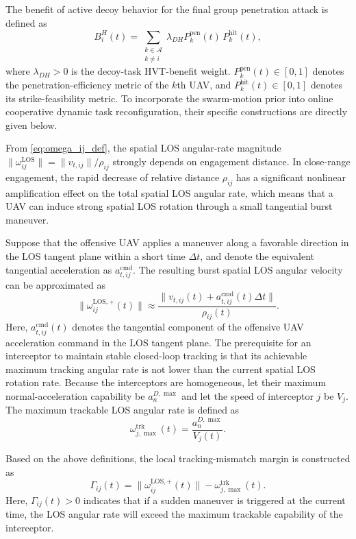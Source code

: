 \documentclass{cja}
\begin{document}
The benefit of active decoy behavior for the final group penetration attack is defined as
\begin{equation}
B_i^{H}(t)
=
\sum_{\substack{k\in\mathcal{A}\\k\neq i}}
\lambda_{DH} P_k^{\mathrm{pen}}(t)\,P_k^{\mathrm{hit}}(t),
\end{equation}
where $\lambda_{DH}>0$ is the decoy-task HVT-benefit weight. $P_k^{\mathrm{pen}}(t)\in[0,1]$ denotes the penetration-efficiency metric of the $k$th UAV, and $P_k^{\mathrm{hit}}(t)\in[0,1]$ denotes its strike-feasibility metric. To incorporate the swarm-motion prior into online cooperative dynamic task reconfiguration, their specific constructions are directly given below.

From \eqref{eq:omega_ij_def}, the spatial LOS angular-rate magnitude $\|\omega_{ij}^{\mathrm{LOS}}\| = \|v_{t,ij}\|/\rho_{ij}$ strongly depends on engagement distance. In close-range engagement, the rapid decrease of relative distance $\rho_{ij}$ has a significant nonlinear amplification effect on the total spatial LOS angular rate, which means that a UAV can induce strong spatial LOS rotation through a small tangential burst maneuver.

Suppose that the offensive UAV applies a maneuver along a favorable direction in the LOS tangent plane within a short time $\Delta t$, and denote the equivalent tangential acceleration as $a_{t,ij}^{\mathrm{cmd}}$. The resulting burst spatial LOS angular velocity can be approximated as
\begin{equation}
\|\omega_{ij}^{\mathrm{LOS},+}(t)\|
\approx
\frac{\|v_{t,ij}(t)+a_{t,ij}^{\mathrm{cmd}}(t)\Delta t\|}{\rho_{ij}(t)}.
\end{equation}
Here, $a_{t,ij}^{\mathrm{cmd}}(t)$ denotes the tangential component of the offensive UAV acceleration command in the LOS tangent plane.
The prerequisite for an interceptor to maintain stable closed-loop tracking is that its achievable maximum tracking angular rate is not lower than the current spatial LOS rotation rate. Because the interceptors are homogeneous, let their maximum normal-acceleration capability be $a_n^{D,\max}$ and let the speed of interceptor $j$ be $V_j$. The maximum trackable LOS angular rate is defined as
\begin{equation}
\omega_{j,\max}^{\mathrm{trk}}(t)
=
\frac{a_n^{D,\max}}{V_j(t)}.
\end{equation}

Based on the above definitions, the local tracking-mismatch margin is constructed as
\begin{equation}
\Gamma_{ij}(t)
=
\|\omega_{ij}^{\mathrm{LOS},+}(t)\|
-
\omega_{j,\max}^{\mathrm{trk}}(t).
\end{equation}
Here, $\Gamma_{ij}(t)>0$ indicates that if a sudden maneuver is triggered at the current time, the LOS angular rate will exceed the maximum trackable capability of the interceptor.
\end{document}
